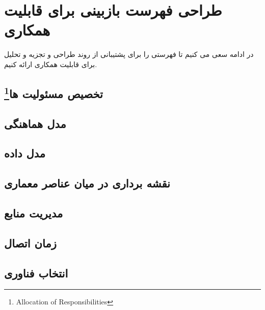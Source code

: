 \section{طراحی فهرست بازبینی برای قابلیت همکاری}

در ادامه سعی می کنیم تا فهرستی را برای پشتیبانی از روند طراحی و تجزیه و تحلیل برای قابلیت همکاری ارائه کنیم.


\subsection{تخصیص مسئولیت ها\footnote{Allocation of Responsibilities} } 

\subsection{مدل هماهنگی }

\subsection{مدل داده }

\subsection{نقشه برداری در میان عناصر معماری }

\subsection{مدیریت منابع }

\subsection{زمان اتصال }

\subsection{انتخاب فناوری }









